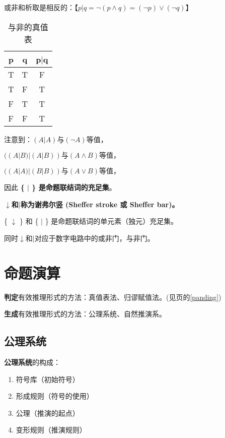 \documentclass[12pt,onecolumn,a4paper]{book}
\numberwithin{table}{subsection}
\numberwithin{equation}{subsection}
\begin{document}
或非和析取是相反的：【$p | q = \neg(p\wedge q)= (\neg p)\vee (\neg q)$】

\begin{table}[h]
    \centering
    \setlength{\tabcolsep}{5mm}
    \begin{tabular}{c c c}
        \toprule
        p & q & p$|$q \\
        \midrule
        T & T & F \\
        T & F & T \\
        F & T & T \\
        F & F & T \\
        \bottomrule
      \end{tabular}
    \caption{与非的真值表}
\end{table}

注意到：$(A|A) \text{与} (\neg A) \text{等值，}$ 

$((A|B)|(A|B)) \text{与} (A\wedge B) \text{等值，} $

$((A|A)|(B|B)) \text{与} (A\vee B) \text{等值，} $

因此\textbf{ \{ $|$ \} 是命题联结词的充足集}。

\textbf{$\downarrow$和$|$称为谢弗尔竖 (Sheffer stroke 或 Sheffer bar)。}

\{ $\downarrow$ \} 和  \{ $|$ \} 是命题联结词的单元素（独元）充足集。

同时$\downarrow$和$|$对应于数字电路中的或非门，与非门。

\chapter{命题演算}\label{chap4}

\textbf{判定}有效推理形式的方法：真值表法、归谬赋值法。(见\pageref{panding}页的\ref{panding})

\textbf{生成}有效推理形式的方法：公理系统、自然推演系。

\section{公理系统}

\textbf{公理系统}的构成：

\begin{enumerate}[itemsep=0pt,parsep=0pt]
    \item 符号库（初始符号）
    \item 形成规则（符号的使用）
    \item 公理（推演的起点）
    \item 变形规则（推演规则）
\end{enumerate}
\end{document}
